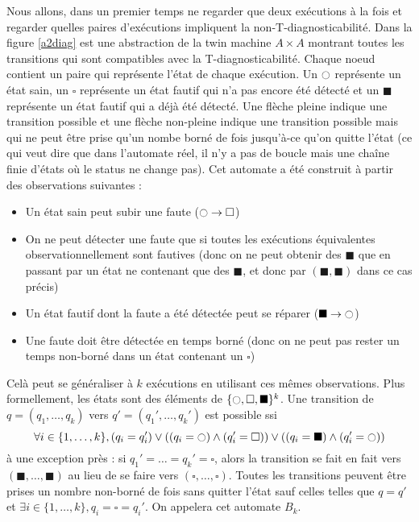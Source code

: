 \documentclass[10pt,a4paper]{article}
\newcommand{\es}{\square}
\newcommand{\fs}{\blacksquare}
\newcommand{\ec}{\ocircle}
\begin{document}
Nous allons, dans un premier temps ne regarder que deux exécutions à la fois et regarder quelles paires d'exécutions impliquent la non-T-diagnosticabilité. Dans la figure \ref{a2diag} est une abstraction de la twin machine $A\times A$ montrant toutes les transitions qui sont compatibles avec la T-diagnosticabilité. Chaque noeud contient un paire qui représente l'état de chaque exécution. Un $\ec$ représente un état sain, un $\es$ représente un état fautif qui n'a pas encore été détecté et un $\fs$ représente un état fautif qui a déjà été détecté. Une flèche pleine indique une transition possible et une flèche non-pleine indique une transition possible mais qui ne peut être prise qu'un nombe borné de fois jusqu'à-ce qu'on quitte l'état (ce qui veut dire que dans l'automate réel, il n'y a pas de boucle mais une chaîne finie d'états où le status ne change pas). Cet automate a été construit \`a partir des observations suivantes :
\begin{itemize}
	\item Un état sain peut subir une faute ($\ec \to \es$)
	\item On ne peut détecter une faute que si toutes les exécutions équivalentes observationnellement sont fautives (donc on ne peut obtenir des $\fs$ que en passant par un état ne contenant que des $\fs$, et donc par $(\fs,\fs)$ dans ce cas précis)
	\item Un état fautif dont la faute a été détectée peut se réparer ($\fs\to \ec$)
	\item Une faute doit être détectée en temps borné (donc on ne peut pas rester un temps non-borné dans un état contenant un $\es$)
\end{itemize}

Celà peut se généraliser à $k$ exécutions en utilisant ces mêmes observations. Plus formellement, les états sont des éléments de $\{\ec, \es, \fs \}^k$. Une transition de $q=(q_1, \dots, q_k)$ vers $q'=(q_1',\dots,q_k')$ est possible ssi $$\forall i \in \{1, \dots, k\}, (q_i = q_i')\lor ((q_i = \ec) \land (q_i'=\es)) \lor ((q_i = \fs)\land (q_i' = \ec))$$
\`a une exception près : si $q_1'=\dots=q_k'=\es$, alors la transition se fait en fait vers $(\fs, \dots, \fs)$ au lieu de se faire vers $(\es, \dots, \es)$. Toutes les transitions peuvent être prises un nombre non-borné de fois sans quitter l'état sauf celles telles que $q= q'$ et $\exists i\in \{1, \dots, k\}, q_i = \es = q_i'$. On appelera cet automate $B_k$.
\end{document}
